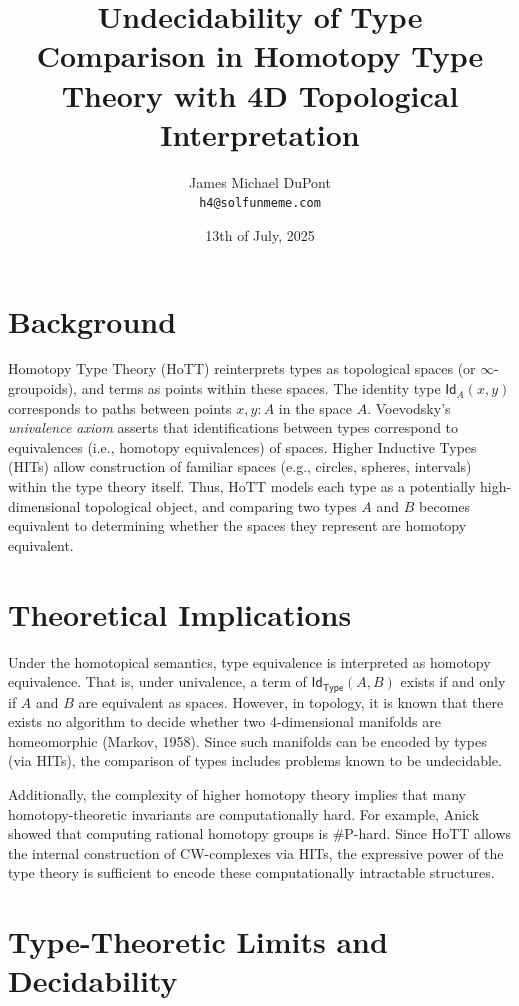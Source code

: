 \documentclass{article}
\title{Undecidability of Type Comparison in Homotopy Type Theory with 4D Topological Interpretation}
\author{James Michael DuPont\\\texttt{h4@solfunmeme.com}}
\date{13th of July, 2025}
\begin{document}
\maketitle

\section*{Background}

Homotopy Type Theory (HoTT) reinterprets types as topological spaces (or $\infty$-groupoids), and terms as points within these spaces. The identity type $\mathsf{Id}_A(x,y)$ corresponds to paths between points $x, y : A$ in the space $A$. Voevodsky’s \emph{univalence axiom} asserts that identifications between types correspond to equivalences (i.e., homotopy equivalences) of spaces. Higher Inductive Types (HITs) allow construction of familiar spaces (e.g., circles, spheres, intervals) within the type theory itself. Thus, HoTT models each type as a potentially high-dimensional topological object, and comparing two types $A$ and $B$ becomes equivalent to determining whether the spaces they represent are homotopy equivalent.

\section*{Theoretical Implications}

Under the homotopical semantics, type equivalence is interpreted as homotopy equivalence. That is, under univalence, a term of $\mathsf{Id}_{\mathsf{Type}}(A,B)$ exists if and only if $A$ and $B$ are equivalent as spaces. However, in topology, it is known that there exists no algorithm to decide whether two 4-dimensional manifolds are homeomorphic (Markov, 1958). Since such manifolds can be encoded by types (via HITs), the comparison of types includes problems known to be undecidable.

Additionally, the complexity of higher homotopy theory implies that many homotopy-theoretic invariants are computationally hard. For example, Anick showed that computing rational homotopy groups is \#P-hard. Since HoTT allows the internal construction of CW-complexes via HITs, the expressive power of the type theory is sufficient to encode these computationally intractable structures.

\section*{Type-Theoretic Limits and Decidability}
\end{document}
